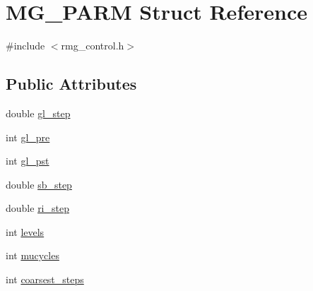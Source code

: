 \hypertarget{struct_m_g___p_a_r_m}{\section{M\-G\-\_\-\-P\-A\-R\-M Struct Reference}
\label{struct_m_g___p_a_r_m}
}


{\ttfamily \#include $<$rmg\-\_\-control.\-h$>$}

\subsection*{Public Attributes}
\begin{DoxyCompactItemize}
\item 
double \hyperlink{struct_m_g___p_a_r_m_ad97b113e8a23ed462c7a3b631be58550}{gl\-\_\-step}
\item 
int \hyperlink{struct_m_g___p_a_r_m_a96da8d229d04a0f264b25200eac19c7c}{gl\-\_\-pre}
\item 
int \hyperlink{struct_m_g___p_a_r_m_a53badc2f0989f28b0dd7cbd4d84f424a}{gl\-\_\-pst}
\item 
double \hyperlink{struct_m_g___p_a_r_m_a43933c75f7ede8ab195cea37b0259df5}{sb\-\_\-step}
\item 
double \hyperlink{struct_m_g___p_a_r_m_a069d9320141785c704307969b7904774}{ri\-\_\-step}
\item 
int \hyperlink{struct_m_g___p_a_r_m_a4e9bf1680b7f9689bb23c13e1789ca48}{levels}
\item 
int \hyperlink{struct_m_g___p_a_r_m_a24e0b30e3b9d8316006b5523294b17d8}{mucycles}
\item 
int \hyperlink{struct_m_g___p_a_r_m_a5b69ace4bfa31087f461224cec080ec0}{coarsest\-\_\-steps}
\end{DoxyCompactItemize}


